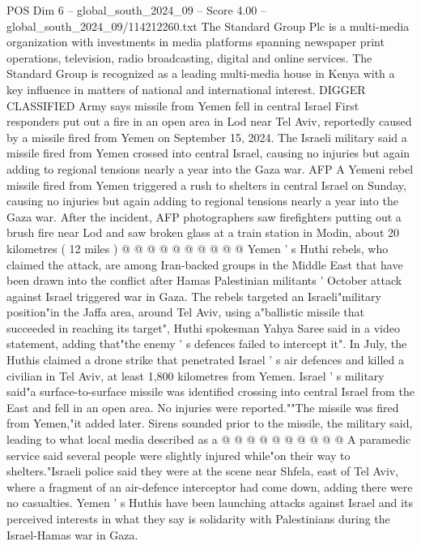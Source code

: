 \begin{textsample}{POS Dim 6 – global\_south\_2024\_09 – Score 4.00 – global\_south\_2024\_09/114212260.txt}  \label{ex:f6_pos_435}
The Standard Group Plc is a multi-media organization with investments in media platforms spanning newspaper print operations, television, radio broadcasting, digital and online services.
The Standard Group is recognized as a leading multi-media house in Kenya with a key influence in matters of national and international interest.
DIGGER CLASSIFIED Army says missile from Yemen fell in central Israel First responders put out a fire in an open area in Lod near Tel Aviv, reportedly caused by a missile fired from Yemen on September 15, 2024.
The Israeli military said a missile fired from Yemen crossed into central Israel, causing no injuries but again adding to regional tensions nearly a year into the Gaza war.
AFP A Yemeni rebel missile fired from Yemen triggered a rush to shelters in central Israel on Sunday, causing no injuries but again adding to regional tensions nearly a year into the Gaza war.
After the incident, AFP photographers saw firefighters putting out a brush fire near Lod and saw broken glass at a train station in Modin, about 20 kilometres ( 12 miles ) @ @ @ @ @ @ @ @ @ @ Yemen ' s Huthi rebels, who claimed the attack, are among Iran-backed groups in the Middle East that have been drawn into the conflict after Hamas Palestinian militants ' October attack against Israel triggered war in Gaza.
The rebels targeted an Israeli"military position"in the Jaffa area, around Tel Aviv, using a"ballistic missile that succeeded in reaching its target", Huthi spokesman Yahya Saree said in a video statement, adding that"the enemy ' s defences failed to intercept it".
In July, the Huthis claimed a drone strike that penetrated Israel ' s air defences and killed a civilian in Tel Aviv, at least 1,800 kilometres from Yemen.
Israel ' s military said"a surface-to-surface missile was identified crossing into central Israel from the East and fell in an open area.
No injuries were reported.""The missile was fired from Yemen,"it added later.
Sirens sounded prior to the missile, the military said, leading to what local media described as a @ @ @ @ @ @ @ @ @ @ A paramedic service said several people were slightly injured while"on their way to shelters."Israeli police said they were at the scene near Shfela, east of Tel Aviv, where a fragment of an air-defence interceptor had come down, adding there were no casualties.
Yemen ' s Huthis have been launching attacks against Israel and its perceived interests in what they say is solidarity with Palestinians during the Israel-Hamas war in Gaza.

\end{textsample}
